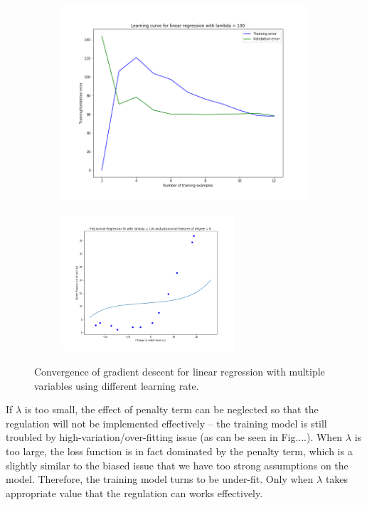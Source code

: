 \documentclass[english,11pt]{article}
\begin{document}
\begin{figure}[H]
\centering
\begin{subfigure}{.5\textwidth}
\centering
\includegraphics[width=.7\linewidth]{../hw1/part2/fig3_2_A4_learning_curve_lambda_100.png}
\end{subfigure}%
\begin{subfigure}{.5\textwidth}
\centering
\includegraphics[width=0.7\textwidth]{../hw1/part2/fig3_2_A4_polynomial_fit_lambda_100.png}
\end{subfigure}

\caption{Convergence of gradient descent for linear regression with multiple variables using different learning rate.}
\label{fig:3_2_A4}
\end{figure}

If $\lambda$ is too small, the effect of penalty term can be neglected so that the regulation will not be implemented effectively -- the training model is still troubled by high-variation/over-fitting issue (as can be seen in Fig....). When $\lambda$ is too large, the loss function is in fact dominated by the penalty term, which is a slightly similar to the biased issue that we have too strong assumptions on the model. Therefore, the training model turns to be under-fit.  Only when $\lambda$ takes appropriate value that the regulation can works effectively.
\end{document}
